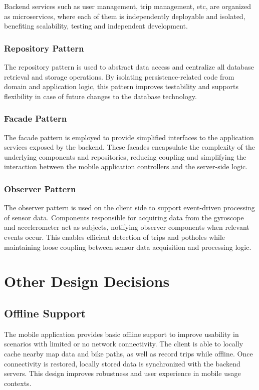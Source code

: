 Backend services such as user management, trip management, etc, are organized as microservices, where each of them is independently deployable and isolated, benefiting scalability, testing and independent development.

\subsubsection{Repository Pattern}
The repository pattern is used to abstract data access and centralize all database retrieval and storage operations. By isolating persistence-related code from domain and application logic, this pattern improves testability and supports flexibility in case of future changes to the database technology.


\subsubsection{Facade Pattern}
The facade pattern is employed to provide simplified interfaces to the application services exposed by the backend. These facades encapsulate the complexity of the underlying components and repositories, reducing coupling and simplifying the interaction between the mobile application controllers and the server-side logic.

\subsubsection{Observer Pattern}

The observer pattern is used on the client side to support event-driven processing of sensor data. Components responsible for acquiring data from the gyroscope and accelerometer act as subjects, notifying observer components when relevant events occur. This enables efficient detection of trips and potholes while maintaining loose coupling between sensor data acquisition and processing logic.

\section{Other Design Decisions}
\label{sec:other_design_decisions}%

\subsection{Offline Support}

The mobile application provides basic offline support to improve usability in scenarios with limited or no network connectivity. The client is able to locally cache nearby map data and bike paths, as well as record trips while offline. Once connectivity is restored, locally stored data is synchronized with the backend servers. This design improves robustness and user experience in mobile usage contexts.


